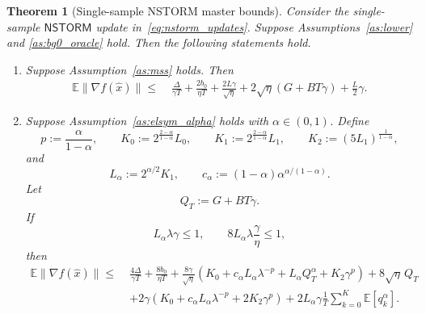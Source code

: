 \documentclass[letter,11pt]{article}
\newtheorem{theorem}{Theorem}[]
\newcommand{\E}{\mathbb{E}}
\begin{document}
\begin{theorem}[Single-sample NSTORM master bounds]
\label{thm:app_nstorm_master}
Consider the single-sample \(\mathsf{NSTORM}\) update
in~\eqref{eq:nstorm_updates}. Suppose Assumptions~\ref{as:lower} and
\ref{as:bg0_oracle} hold. Then the following statements hold.

\begin{enumerate}[label=(\roman*), leftmargin=*]

\item Suppose Assumption~\ref{as:mss} holds. Then
\begin{equation}
\label{eq:app_nstorm_master_mss}
\begin{aligned}
    \E\|\nabla f(\widehat x)\|
    \le\;&
    \frac{\Delta}{\gamma T}
    +
    \frac{2b_0}{\eta T}
    +
    \frac{2L\gamma}{\sqrt\eta}
    +
    2\sqrt\eta(G+BT\gamma)
    +
    \frac{L}{2}\gamma .
\end{aligned}
\end{equation}

\item Suppose Assumption~\ref{as:elsym_alpha} holds with
\(\alpha\in(0,1)\). Define
\[
    p:=\frac{\alpha}{1-\alpha},
    \qquad
    K_0:=2^{\frac{2-\alpha}{1-\alpha}}L_0,
    \qquad
    K_1:=2^{\frac{2-\alpha}{1-\alpha}}L_1,
    \qquad
    K_2:=(5L_1)^{\frac1{1-\alpha}},
\]
and
\[
    L_\alpha:=2^{\alpha/2}K_1,
    \qquad
    c_\alpha:=(1-\alpha)\alpha^{\alpha/(1-\alpha)}.
\]
Let
\[
    Q_T:=G+BT\gamma.
\]
If
\[
    L_\alpha\lambda\gamma\le1,
    \qquad
    8L_\alpha\lambda\frac{\gamma}{\eta}\le1,
\]
then
\begin{equation}
\label{eq:app_nstorm_master_alpha}
\begin{aligned}
    \E\|\nabla f(\widehat x)\|
    \le\;&
    \frac{4\Delta}{\gamma T}
    +
    \frac{8b_0}{\eta T}+
    \frac{8\gamma}{\sqrt\eta}
    \left(
        K_0
        +
        c_\alpha L_\alpha\lambda^{-p}
        +
        L_\alpha Q_T^\alpha
        +
        K_2\gamma^p
    \right)
    +
    8\sqrt\eta\,Q_T
    \\
    &+
    2\gamma
    \left(
        K_0
        +
        c_\alpha L_\alpha\lambda^{-p}
        +
        2K_2\gamma^p
    \right)
    +
    2L_\alpha\gamma
    \frac1T\sum_{k=0}^K \E[q_k^\alpha].
\end{aligned}
\end{equation}


\end{enumerate}
\end{theorem}
\end{document}
